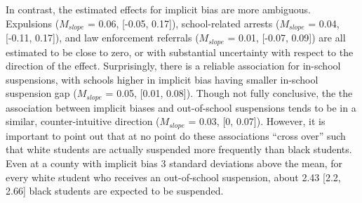 \documentclass[9pt,twocolumn,twoside,lineno]{pnas-new}
\begin{document}
In contrast, the estimated effects for implicit bias are more ambiguous.
Expulsions (\(M_{slope}\) = 0.06, {[}-0.05, 0.17{]}), school-related
arrests (\(M_{slope}\) = 0.04, {[}-0.11, 0.17{]}), and law enforcement
referrals (\(M_{slope}\) = 0.01, {[}-0.07, 0.09{]}) are all estimated to
be close to zero, or with substantial uncertainty with respect to the
direction of the effect. Surprisingly, there is a reliable association
for in-school suspensions, with schools higher in implicit bias having
smaller in-school suspension gap (\(M_{slope}\) = 0.05, {[}0.01,
0.08{]}). Though not fully conclusive, the the association between
implicit biases and out-of-school suspensions tends to be in a similar,
counter-intuitive direction (\(M_{slope}\) = 0.03, {[}0, 0.07{]}).
However, it is important to point out that at no point do these
associations ``cross over'' such that white students are actually
suspended more frequently than black students. Even at a county with
implicit bias 3 standard deviations above the mean, for every white
student who receives an out-of-school suspension, about 2.43 {[}2.2,
2.66{]} black students are expected to be suspended.
\end{document}
